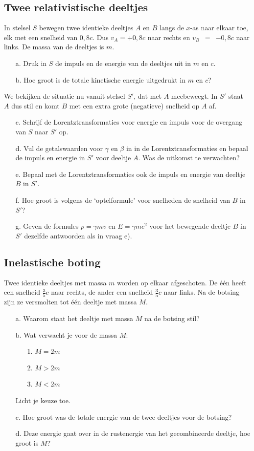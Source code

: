 \subsection{Twee relativistische deeltjes}
In stelsel $S$ bewegen twee identieke deeltjes $A$ en $B$ langs
de $x$-as naar elkaar toe, elk met een snelheid van $0,8c$.
Dus $v_{A} = +0,8c$ naar rechts en $v_{B}$~$=$~$-0,8c$ naar links.
De massa van de deeltjes is $m$.
\begin{itemize}
\item [a.]
Druk in $S$ de impuls en de energie van de deeltjes uit in $m$ en 
$c$.
\item [b.]
Hoe groot is de totale kinetische energie uitgedrukt in $m$ en $c$?
\end{itemize}
We bekijken de situatie nu vanuit stelsel $S'$, dat met $A$ meebeweegt. 
In $S'$ staat $A$ dus stil en komt $B$ met een extra grote (negatieve)
snelheid op $A$ af.
\begin{itemize}
\item [c.]
Schrijf de Lorentztransformaties voor energie en impuls voor de overgang van 
$S$ naar $S'$ op.
\item [d.]
Vul de getalswaarden voor $\gamma$ en $\beta$ in in de Lorentztransformaties en
bepaal de impuls en energie in $S'$ voor deeltje $A$. 
Was de uitkomst te verwachten?
\item [e.]
Bepaal met de Lorentztransformaties ook de impuls en energie van 
deeltje $B$ in $S'$.
\item [f.]
Hoe groot is volgens de `optelformule' voor snelheden de snelheid
van $B$ in $S'$?
\item [g.]
Geven de formules $p = \gamma mv$ en $E = \gamma mc^{2}$ voor het
bewegende deeltje $B$ in $S'$ dezelfde antwoorden als in vraag e).
\end{itemize}

\newpage
\subsection{Inelastische boting}
Twee identieke deeltjes met massa $m$ worden op elkaar afgeschoten.
De \'{e}\'{e}n heeft een snelheid $\frac{3}{5}c$ naar rechts, 
de ander een snelheid $\frac{3}{5}c$ naar links.
Na de botsing zijn ze versmolten tot \'{e}\'{e}n deeltje met massa $M$.
\begin{itemize}
\item [a.]
Waarom staat het deeltje met massa $M$ na de botsing stil?
\item [b.]
Wat verwacht je voor de massa $M$:
\begin{itemize}
\item [1.]
$M = 2m$
\item [2.]
$M > 2m$
\item [3.]
$M < 2m$
\end{itemize}
Licht je keuze toe.
\item [c.]
Hoe groot was de totale energie van de twee deeltjes voor de botsing?
\item [d.]
Deze energie gaat over in de rustenergie van het gecombineerde deeltje, 
hoe groot is $M$?
\end{itemize}

